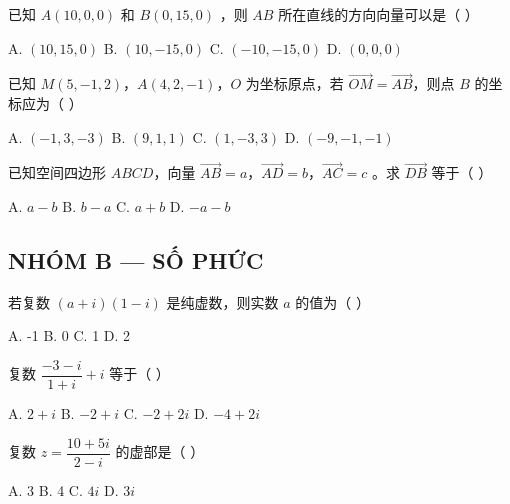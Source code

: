 \documentclass[11pt, a4paper]{article}
\begin{document}
\begin{baitap}[6]
已知 $A(10,0,0)$ 和 $B(0,15,0)$ ，则 $AB$ 所在直线的方向向量可以是（ ）
\par\vspace{3pt}
\noindent A. $(10,15,0)$ \quad B. $(10,-15,0)$ \quad C. $(-10,-15,0)$ \quad D. $(0,0,0)$
\end{baitap}

\begin{baitap}[7]
已知 $M(5, -1, 2)$，$A(4, 2, -1)$，$O$ 为坐标原点，若 $\overrightarrow{OM} = \overrightarrow{AB}$，则点 $B$ 的坐标应为（ ）
\par\vspace{3pt}
\noindent A. $(-1, 3, -3)$ \quad B. $(9, 1, 1)$ \quad C. $(1, -3, 3)$ \quad D. $(-9, -1, -1)$
\end{baitap}

\begin{baitap}[8]
已知空间四边形 $ABCD$，向量 $\overrightarrow{AB} = a$，$\overrightarrow{AD} = b$，$\overrightarrow{AC} = c$ 。求 $\overrightarrow{DB}$ 等于（ ）
\par\vspace{3pt}
\noindent A. $a - b$ \quad B. $b - a$ \quad C. $a + b$ \quad D. $-a - b$
\end{baitap}

\subsection*{NHÓM B — SỐ PHỨC}

\begin{baitap}[9]
若复数 $(a + i)(1 - i)$ 是纯虚数，则实数 $a$ 的值为（ ）
\par\vspace{3pt}
\noindent A. -1 \quad B. 0 \quad C. 1 \quad D. 2
\end{baitap}

\begin{baitap}[10]
复数 $\dfrac{-3-i}{1+i} + i$ 等于（ ）
\par\vspace{3pt}
\noindent A. $2 + i$ \quad B. $-2 + i$ \quad C. $-2 + 2i$ \quad D. $-4 + 2i$
\end{baitap}

\begin{baitap}[11]
复数 $z = \dfrac{10+5i}{2-i}$ 的虚部是（ ）
\par\vspace{3pt}
\noindent A. 3 \quad B. 4 \quad C. $4i$ \quad D. $3i$
\end{baitap}
\end{document}
